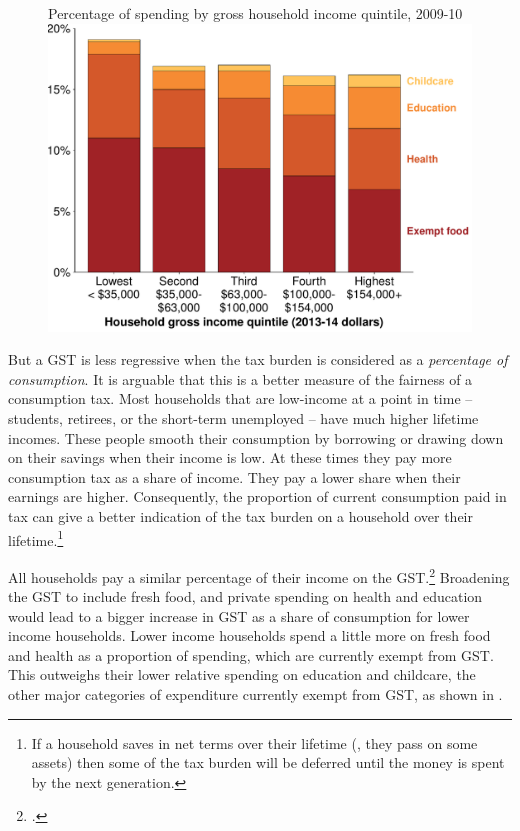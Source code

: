 \begin{figure}[tb]
%
{Percentage of spending by gross household income quintile, 2009-10}
\includegraphics[width=\columnwidth]{atlas/figure/GST-Figure-4-1-tikzd.pdf}
\end{figure}

But a GST is less regressive when the tax burden is considered as a \emph{percentage of consumption}. It is arguable that this is a better measure of the fairness of a consumption tax. Most households that are low-income at a point in time – students, retirees, or the short-term unemployed – have much higher lifetime incomes. These people smooth their consumption by borrowing or drawing down on their savings when their income is low. At these times they pay more consumption tax as a share of income. They pay a lower share when their earnings are higher. Consequently, the proportion of current consumption paid in tax can give a better indication of the tax burden on a household over their lifetime.\footnote{\textcites[][275]{HenryTaxReview2010}[][34--36]{OECDKoreaInstitutePublicFinance2014-Distributional-Effects-Consumption-Taxes} If a household saves in net terms over their lifetime (\ie, they pass on some assets) then some of the tax burden will be deferred until the money is spent by the next generation.}

All households pay a similar percentage of their income on the GST.\footcite[][41]{OECDKoreaInstitutePublicFinance2014-Distributional-Effects-Consumption-Taxes} Broadening the GST to include fresh food, and private spending on health and education would lead to a bigger increase in GST as a share of consumption for lower income households. Lower income households spend a little more on fresh food and health as a proportion of spending, which are currently exempt from GST. This outweighs their lower relative spending on education and childcare, the other major categories of expenditure currently exempt from GST, as shown in .


